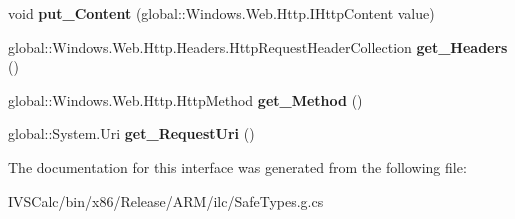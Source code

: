 \begin{DoxyCompactItemize}
void {\bfseries put\+\_\+\+Content} (global\+::\+Windows.\+Web.\+Http.\+I\+Http\+Content value)
\item 
\mbox{\label{interface_windows_1_1_web_1_1_http_1_1_i_http_request_message_a673256b5835bfd09b1edd689fb5333ad}} 
global\+::\+Windows.\+Web.\+Http.\+Headers.\+Http\+Request\+Header\+Collection {\bfseries get\+\_\+\+Headers} ()
\item 
\mbox{\label{interface_windows_1_1_web_1_1_http_1_1_i_http_request_message_a91a5d1f2da9e595f9d1b6c72e674d3dc}} 
global\+::\+Windows.\+Web.\+Http.\+Http\+Method {\bfseries get\+\_\+\+Method} ()
\item 
\mbox{\label{interface_windows_1_1_web_1_1_http_1_1_i_http_request_message_ace91874a34280b89ed6f4237fc3806df}} 
global\+::\+System.\+Uri {\bfseries get\+\_\+\+Request\+Uri} ()
\end{DoxyCompactItemize}


The documentation for this interface was generated from the following file\+:\begin{DoxyCompactItemize}
\item 
I\+V\+S\+Calc/bin/x86/\+Release/\+A\+R\+M/ilc/Safe\+Types.\+g.\+cs\end{DoxyCompactItemize}
